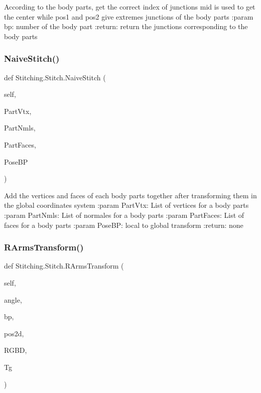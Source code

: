 \begin{DoxyVerb}According to the body parts, get the correct index of junctions
mid is used to get the center while pos1 and pos2 give extremes junctions of the body parts
:param bp: number of the body part
:return: return the junctions corresponding to the body parts
\end{DoxyVerb}
 \mbox{\label{class_stitching_1_1_stitch_ac88004e122bb16c19ef3038d856be04a}} 
\subsubsection{\texorpdfstring{Naive\+Stitch()}{NaiveStitch()}}
{\footnotesize\ttfamily def Stitching.\+Stitch.\+Naive\+Stitch (\begin{DoxyParamCaption}\item[{}]{self,  }\item[{}]{Part\+Vtx,  }\item[{}]{Part\+Nmls,  }\item[{}]{Part\+Faces,  }\item[{}]{Pose\+BP }\end{DoxyParamCaption})}

\begin{DoxyVerb}Add the vertices and faces of each body parts
together after transforming them in the global coordinates system
:param PartVtx: List of vertices for a body parts
:param PartNmls: List of normales for a body parts
:param PartFaces:  List of faces for a body parts
:param PoseBP: local to global transform
:return: none
\end{DoxyVerb}
 \mbox{\label{class_stitching_1_1_stitch_a14624518ed5cbc4422762ff59d3c5bb8}} 
\subsubsection{\texorpdfstring{R\+Arms\+Transform()}{RArmsTransform()}}
{\footnotesize\ttfamily def Stitching.\+Stitch.\+R\+Arms\+Transform (\begin{DoxyParamCaption}\item[{}]{self,  }\item[{}]{angle,  }\item[{}]{bp,  }\item[{}]{pos2d,  }\item[{}]{R\+G\+BD,  }\item[{}]{Tg }\end{DoxyParamCaption})}

